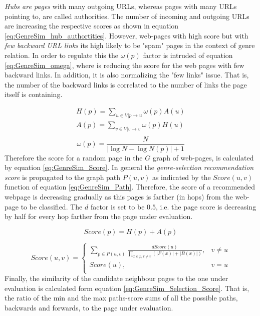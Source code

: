 \textit{Hubs are pages} with many outgoing URLs, whereas pages with many URLs pointing to, are called authorities. The number of incoming and outgoing URLs are increasing the respective scores as shown in equation \ref{eq:GenreSim_hub_authortities}. However, web-pages with high score but with \textit{few backward URL links} its high likely to be "spam" pages in the context of genre relation. In order to regulate this the $\omega(p)$ factor is intruded of equation \ref{eq:GenreSim_omega}, where is reducing the score for the web pages with few backward links. In addition, it is also normalizing the "few links" issue. That is, the number of the backward links is correlated to the number of links the page itself is containing. 

\begin{equation}\label{eq:GenreSim_hub_authortities}
	\begin{array}{l}
		H(p) = \sum_{u \in V|p \to u} \omega(p) A(u) \\  
    	A(p) = \sum_{v \in V|v \to v} \omega(p) H(u) \\
    \end{array}
\end{equation}
\begin{equation}\label{eq:GenreSim_omega}
	\omega(p) = \frac{N}{|\log N - \log N(p) | + 1} 
\end{equation}
Therefore the score for a random page in the $G$ graph of web-pages, is calculated by equation \ref{eq:GenreSim_Score}. In general the \textit{genre-selection recommendation score} is propagated to the graph path $P(u,v)$ as indicated by the $Score(u, v)$ function of equation \ref{eq:GenreSim_Path}. Therefore, the score of a recommended webpage is decreasing gradually as this pages is farther (in hops) from the web-page to be classified. The $d$ factor is set to be $0.5$, i.e. the page score is decreasing by half for every hop farther from the page under evaluation. 

\begin{equation}\label{eq:GenreSim_Score}
	Score(p) = H(p) + A(p)
\end{equation}

\begin{equation}\label{eq:GenreSim_Path}
	Score(u, v) =
      \begin{cases}
      	\sum_{p \in P(u, v)} \frac{d Score(u)}{\prod_{x \in p, x  \neq v} (|F(x)| +|B(x)|)}, & v \neq u \\
        Score(u), & v = u \\ 
       \end{cases}
\end{equation}
Finally, the similarity of the candidate neighbour pages to the one under evaluation is calculated form equation \ref{eq:GenreSim_Selection_Score}. That is, the ratio of the min and the max paths-score sums of all the possible paths, backwards and forwards, to the page under evaluation.

